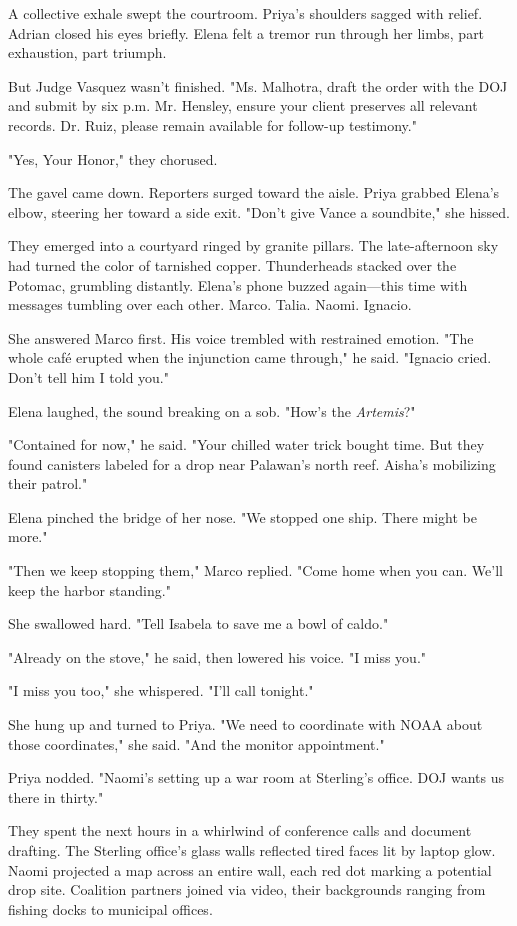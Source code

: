 A collective exhale swept the courtroom. Priya's shoulders sagged with relief. Adrian closed his eyes briefly. Elena felt a tremor run through her limbs, part exhaustion, part triumph.

But Judge Vasquez wasn't finished. "Ms. Malhotra, draft the order with the DOJ and submit by six p.m. Mr. Hensley, ensure your client preserves all relevant records. Dr. Ruiz, please remain available for follow-up testimony."

"Yes, Your Honor," they chorused.

The gavel came down. Reporters surged toward the aisle. Priya grabbed Elena's elbow, steering her toward a side exit. "Don't give Vance a soundbite," she hissed.

They emerged into a courtyard ringed by granite pillars. The late-afternoon sky had turned the color of tarnished copper. Thunderheads stacked over the Potomac, grumbling distantly. Elena's phone buzzed again—this time with messages tumbling over each other. Marco. Talia. Naomi. Ignacio.

She answered Marco first. His voice trembled with restrained emotion. "The whole café erupted when the injunction came through," he said. "Ignacio cried. Don't tell him I told you."

Elena laughed, the sound breaking on a sob. "How's the \textit{Artemis}?"

"Contained for now," he said. "Your chilled water trick bought time. But they found canisters labeled for a drop near Palawan's north reef. Aisha's mobilizing their patrol."

Elena pinched the bridge of her nose. "We stopped one ship. There might be more."

"Then we keep stopping them," Marco replied. "Come home when you can. We'll keep the harbor standing."

She swallowed hard. "Tell Isabela to save me a bowl of caldo."

"Already on the stove," he said, then lowered his voice. "I miss you."

"I miss you too," she whispered. "I'll call tonight."

She hung up and turned to Priya. "We need to coordinate with NOAA about those coordinates," she said. "And the monitor appointment."

Priya nodded. "Naomi's setting up a war room at Sterling's office. DOJ wants us there in thirty."

They spent the next hours in a whirlwind of conference calls and document drafting. The Sterling office's glass walls reflected tired faces lit by laptop glow. Naomi projected a map across an entire wall, each red dot marking a potential drop site. Coalition partners joined via video, their backgrounds ranging from fishing docks to municipal offices.

